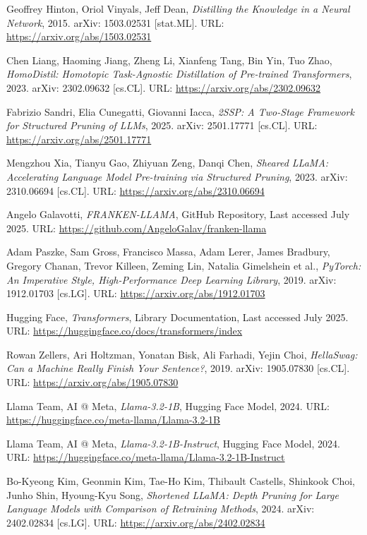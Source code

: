 \begin{thebibliography}{9}
	Geoffrey Hinton, Oriol Vinyals, Jeff Dean,
	\textit{Distilling the Knowledge in a Neural Network},
	2015. arXiv: 1503.02531 [stat.ML]. URL: \url{https://arxiv.org/abs/1503.02531}
	
	Chen Liang, Haoming Jiang, Zheng Li, Xianfeng Tang, Bin Yin, Tuo Zhao,
	\textit{HomoDistil: Homotopic Task-Agnostic Distillation of Pre-trained Transformers},
	2023. arXiv: 2302.09632 [cs.CL]. URL: \url{https://arxiv.org/abs/2302.09632}

	Fabrizio Sandri, Elia Cunegatti, Giovanni Iacca,
	\textit{2SSP: A Two-Stage Framework for Structured Pruning of LLMs},
	2025. arXiv: 2501.17771 [cs.CL]. URL: \url{https://arxiv.org/abs/2501.17771}

	Mengzhou Xia, Tianyu Gao, Zhiyuan Zeng, Danqi Chen,
	\textit{Sheared LLaMA: Accelerating Language Model Pre-training via Structured Pruning},
	2023. arXiv: 2310.06694 [cs.CL]. URL: \url{https://arxiv.org/abs/2310.06694}

	Angelo Galavotti,
	\textit{FRANKEN-LLAMA}, GitHub Repository, Last accessed July 2025. URL:
	\url{https://github.com/AngeloGalav/franken-llama}

	Adam Paszke, Sam Gross, Francisco Massa, Adam Lerer, James Bradbury, Gregory Chanan, Trevor Killeen, Zeming Lin, Natalia Gimelshein et al.,
	\textit{PyTorch: An Imperative Style, High-Performance Deep Learning Library},
	2019. arXiv: 1912.01703 [cs.LG]. URL: \url{https://arxiv.org/abs/1912.01703}

	Hugging Face,
	\textit{Transformers}, Library Documentation, Last accessed July 2025. URL:
	\url{https://huggingface.co/docs/transformers/index}

	Rowan Zellers, Ari Holtzman, Yonatan Bisk, Ali Farhadi, Yejin Choi,
	\textit{HellaSwag: Can a Machine Really Finish Your Sentence?},
	2019. arXiv: 1905.07830 [cs.CL]. URL: \url{https://arxiv.org/abs/1905.07830}

	Llama Team, AI @ Meta,
	\textit{Llama-3.2-1B},
	Hugging Face Model, 2024. URL: \url{https://huggingface.co/meta-llama/Llama-3.2-1B}

	Llama Team, AI @ Meta,
	\textit{Llama-3.2-1B-Instruct}, Hugging Face Model, 2024. URL:
	\url{https://huggingface.co/meta-llama/Llama-3.2-1B-Instruct}

	Bo-Kyeong Kim, Geonmin Kim, Tae-Ho Kim, Thibault Castells, Shinkook Choi, Junho Shin, Hyoung-Kyu Song,
	\textit{Shortened LLaMA: Depth Pruning for Large Language Models with Comparison of Retraining Methods},
	2024. arXiv: 2402.02834 [cs.LG]. URL: \url{https://arxiv.org/abs/2402.02834}


\end{thebibliography}
